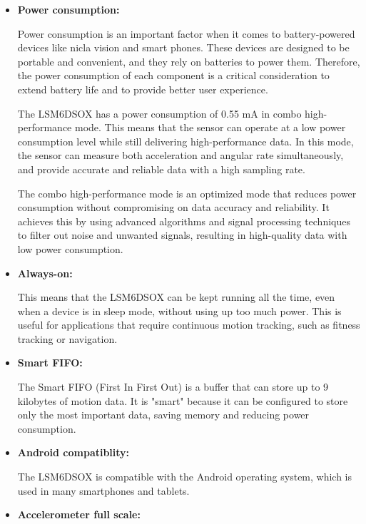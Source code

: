\begin{itemize}
\item  \textbf{Power consumption: }

      Power consumption is an important factor when it comes to battery-powered devices like nicla vision and smart phones. These devices are designed to be portable and convenient, and they rely on batteries to power them. Therefore, the power consumption of each component is a critical consideration to extend battery life and to provide better user experience.

     \bigskip
 
      The LSM6DSOX has a power consumption of 0.55 mA in combo high-performance mode. This means that the sensor can operate at a low power consumption level while still delivering high-performance data. In this mode, the sensor can measure both acceleration and angular rate simultaneously, and provide accurate and reliable data with a high sampling rate.
     
     \bigskip
     
      The combo high-performance mode is an optimized mode that reduces power consumption without compromising on data accuracy and reliability. It achieves this by using advanced algorithms and signal processing techniques to filter out noise and unwanted signals, resulting in high-quality data with low power consumption.
 

\item  \textbf{Always-on:}

 This means that the LSM6DSOX can be kept running all the time, even when a device is in sleep mode, without using up too much power. This is useful for applications that require continuous motion tracking, such as fitness tracking or navigation.


\item  \textbf{Smart FIFO: }

  The Smart FIFO (First In First Out)  is a buffer that can store up to 9 kilobytes of motion data. It is "smart" because it can be configured to store only the most important data, saving memory and reducing power consumption.\cite{Martinez:2022}


\item  \textbf{Android compatiblity:}
 
  The LSM6DSOX is compatible with the Android operating system, which is used in many smartphones and tablets.
 

\item  \textbf{Accelerometer full scale: }


\end{itemize}
